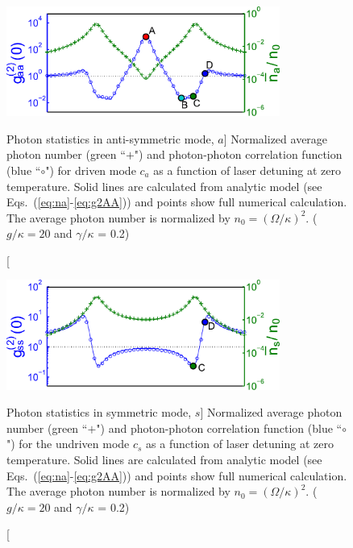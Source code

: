 \begin{figure}
\centering
  \includegraphics[width=0.8\textwidth]{./figs_Komar2013/fig2a.pdf}
  
  \caption
  [Photon statistics in anti-symmetric mode, $a$]
  {
  \label{fig:spectrum_a}
  Normalized average photon number (green ``$+$")
  and photon-photon correlation function (blue ``$\circ$")
  for driven mode $c_a$
  as a function of laser detuning at zero temperature.
  Solid lines are calculated from analytic model
  (see Eqs.~(\ref{eq:na}-\ref{eq:g2AA}))
  and points show full numerical calculation.
  The average photon number is
  normalized by $n_0 = (\Omega/\kappa)^2$. ($g/\kappa = 20$ and $\gamma/\kappa$
  = 0.2)
  }
\end{figure}

\begin{figure}
\centering
  \includegraphics[width=0.8\textwidth]{./figs_Komar2013/fig2b.pdf}
  \caption
  [Photon statistics in symmetric mode, $s$]
  {
  \label{fig:spectrum_b}
  Normalized average photon number (green ``$+$")
  and photon-photon correlation function (blue ``$\circ$")
  for the undriven mode $c_s$
  as a function of laser detuning at zero temperature.
  Solid lines are calculated from analytic model
  (see Eqs.~(\ref{eq:na}-\ref{eq:g2AA}))
  and points show full numerical calculation.
  The average photon number is
  normalized by $n_0 = (\Omega/\kappa)^2$. ($g/\kappa = 20$ and $\gamma/\kappa$
  = 0.2)
  }
\end{figure}
 
